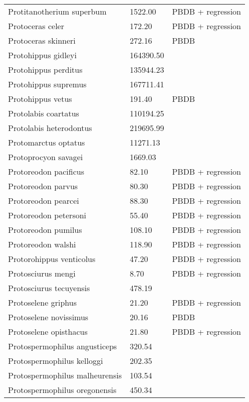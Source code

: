 \begin{longtable}{p{} p{} p{}}
    Protitanotherium superbum & 1522.00 & PBDB + regression \\ 
    Protoceras celer & 172.20 & PBDB + regression \\ 
    Protoceras skinneri & 272.16 & PBDB \\ 
    Protohippus gidleyi & 164390.50 & \cite{Tomiya2013} \\ 
    Protohippus perditus & 135944.23 & \cite{Tomiya2013} \\ 
    Protohippus supremus & 167711.41 & \cite{Tomiya2013} \\ 
    Protohippus vetus & 191.40 & PBDB \\ 
    Protolabis coartatus & 110194.25 & \cite{Tomiya2013} \\ 
    Protolabis heterodontus & 219695.99 & \cite{Tomiya2013} \\ 
    Protomarctus optatus & 11271.13 & \cite{Tomiya2013} \\ 
    Protoprocyon savagei & 1669.03 & \cite{Tomiya2013} \\ 
    Protoreodon pacificus & 82.10 & PBDB + regression \\ 
    Protoreodon parvus & 80.30 & PBDB + regression \\ 
    Protoreodon pearcei & 88.30 & PBDB + regression \\ 
    Protoreodon petersoni & 55.40 & PBDB + regression \\ 
    Protoreodon pumilus & 108.10 & PBDB + regression \\ 
    Protoreodon walshi & 118.90 & PBDB + regression \\ 
    Protorohippus venticolus & 47.20 & PBDB + regression \\ 
    Protosciurus mengi & 8.70 & PBDB + regression \\ 
    Protosciurus tecuyensis & 478.19 & \cite{Tomiya2013} \\ 
    Protoselene griphus & 21.20 & PBDB + regression \\ 
    Protoselene novissimus & 20.16 & PBDB \\ 
    Protoselene opisthacus & 21.80 & PBDB + regression \\ 
    Protospermophilus angusticeps & 320.54 & \cite{Tomiya2013} \\ 
    Protospermophilus kelloggi & 202.35 & \cite{Tomiya2013} \\ 
    Protospermophilus malheurensis & 103.54 & \cite{Tomiya2013} \\ 
    Protospermophilus oregonensis & 450.34 & \cite{Tomiya2013} \\ 

\end{longtable}
